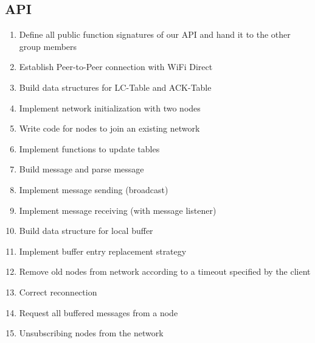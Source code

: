 	
\subsection{API}


\begin{enumerate}

\item Define all public function signatures of our API and hand it to the other group members
\item Establish Peer-to-Peer connection with WiFi Direct
\item Build data structures for LC-Table and ACK-Table
\item Implement network initialization with two nodes
\item Write code for nodes to join an existing network

\item Implement functions to update tables
\item Build message and parse message
\item Implement message sending (broadcast)


\item Implement message receiving (with message listener)
\item Build data structure for local buffer
\item Implement buffer entry replacement strategy
\item Remove old nodes from network according to a timeout specified by the client
\item Correct reconnection
\item Request all buffered messages from a node
\item Unsubscribing nodes from the network
\end{enumerate}
		
